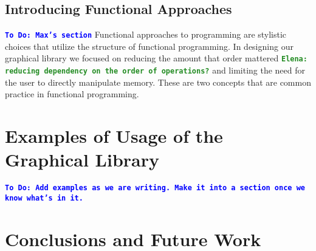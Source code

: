 \documentclass[12pt]{article}
\newcommand{\comment}[1]{{\bf \tt  {#1}}}
\newcommand{\emcomment}[1]{\textcolor{ForestGreen}{\comment{Elena: {#1}}}}
\newcommand{\todo}[1]{\textcolor{blue}{\comment{To Do: {#1}}}}
\begin{document}
\subsection{Introducing Functional Approaches}\label{subsec:functional}
\todo{Max's section}
Functional approaches to programming are stylistic choices that utilize the structure of functional programming. In designing our graphical library we focused on reducing the amount that order mattered 
\emcomment{reducing dependency on the order of operations?}
and limiting the need for the user to directly manipulate memory. These are two concepts that are common practice in functional programming.

\section{Examples of Usage of the Graphical Library}\label{sec:usage}
\todo{Add examples as we are writing.  Make it into a section once we know what's in it.}

\section{Conclusions and Future Work}\label{sec:future-work}


%
%

%  
%
%




\end{document}
